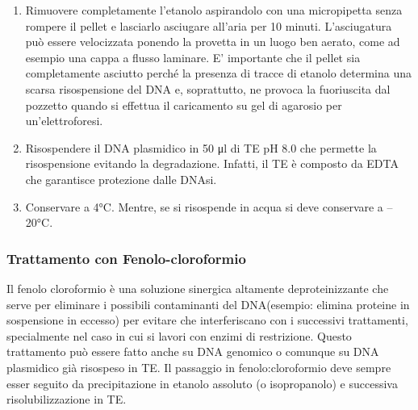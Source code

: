 \begin{enumerate}
  \item Rimuovere completamente l’etanolo aspirandolo con una micropipetta senza rompere il pellet e lasciarlo asciugare all’aria per 10 minuti. L’asciugatura può essere velocizzata ponendo la provetta in un luogo ben aerato, come ad esempio una cappa a flusso laminare. E’ importante che il pellet sia completamente asciutto perché la presenza di tracce di etanolo determina una scarsa risospensione del DNA e, soprattutto, ne provoca la fuoriuscita dal pozzetto quando si effettua il caricamento su gel di agarosio per un’elettroforesi.

  \item Risospendere il DNA plasmidico in 50 μl di TE pH 8.0 che permette la risospensione evitando la degradazione. Infatti, il TE è composto da EDTA che garantisce protezione dalle DNAsi.

  \item Conservare a 4°C. Mentre, se si risospende in acqua si deve conservare a –20°C.

\end{enumerate}

\subsubsection{Trattamento con Fenolo-cloroformio}

Il fenolo cloroformio è una soluzione sinergica altamente deproteinizzante che serve per eliminare i possibili contaminanti del DNA(esempio: elimina proteine in sospensione in eccesso) per evitare che interferiscano con i successivi trattamenti, specialmente nel caso in cui si lavori con enzimi di restrizione. Questo trattamento può essere fatto anche su DNA genomico o comunque su DNA plasmidico già risospeso in TE. Il passaggio in fenolo:cloroformio deve sempre esser seguito da precipitazione in etanolo assoluto (o isopropanolo) e successiva risolubilizzazione in TE.

